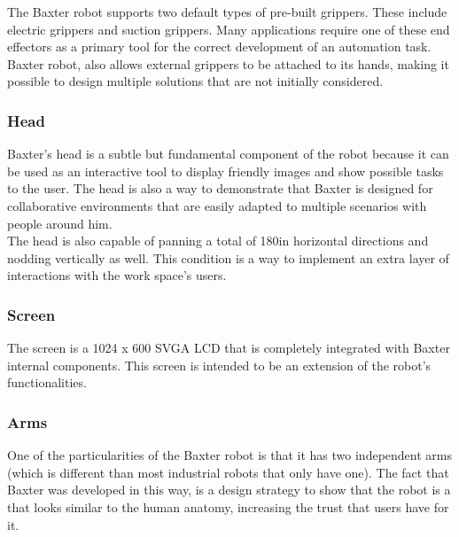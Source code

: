 \documentclass[11pt]{report} %
\begin{document}
The Baxter robot supports two default types of pre-built grippers. These include electric grippers and suction grippers. Many applications require one of these end effectors as a primary tool for the correct development of an automation task.\\

Baxter robot, also allows external  grippers to be attached to its hands, making it possible to design multiple solutions that are not initially considered.\\

\subsubsection{Head}

Baxter's head is a subtle but fundamental component of the robot because it can be used as an interactive tool to display friendly images and show possible tasks to the user. The head is also a way to demonstrate that Baxter is designed for collaborative environments that are easily adapted to multiple scenarios with people around him.\\ 

The head is also capable of panning a total of 180\textdegree \space in horizontal directions and nodding vertically as well. This condition is a way to implement an extra layer of interactions with the work space's users.\\

\subsubsection{Screen}

The screen is a 1024 x 600 SVGA LCD that is completely integrated with Baxter internal components. This screen is intended to be an extension of the robot's functionalities.\\

\subsubsection{Arms}

One of the particularities of the Baxter robot is that it has two independent arms (which is different than most industrial robots that only have one). The fact that Baxter was developed in this way, is a design strategy to show that the robot is a  that looks similar to the human anatomy, increasing the trust that users have for it.\\
\end{document}
